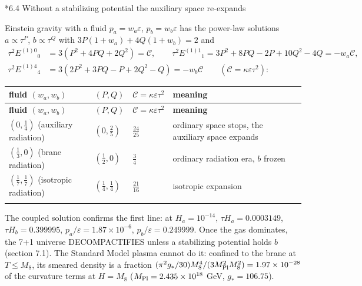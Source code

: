 \documentclass[10pt,a4paper]{article}
\makeatletter
\renewcommand\subsection{\@startsection{subsection}{2}{\z@}{-3.25ex\@plus -1ex \@minus -.2ex}{1.5ex \@plus .2ex}{\normalfont\large\bfseries\raggedright}}
\makeatother
\begin{document}
\subsection*{6.4 Without a stabilizing potential the auxiliary space re-expands}
Einstein gravity with a fluid $p_a=w_a\varepsilon$, $p_b=w_b\varepsilon$ has the power-law solutions $a\propto\tau^P$, $b\propto\tau^Q$ with $3P(1+w_a)+4Q(1+w_b)=2$ and
\begin{align*}
\tau^2E^{(1)0}{}_0&=3(P^2+4PQ+2Q^2)=\mathcal C,\qquad \tau^2E^{(1)1}{}_1=3P^2+8PQ-2P+10Q^2-4Q=-w_a\mathcal C, \\
\tau^2E^{(1)4}{}_4&=3(2P^2+3PQ-P+2Q^2-Q)=-w_b\mathcal C\qquad(\mathcal C=\kappa\varepsilon\tau^2):
\end{align*}
{\footnotesize
\begin{longtable}{>{\raggedright\arraybackslash}p{}>{\raggedright\arraybackslash}p{}>{\raggedright\arraybackslash}p{}>{\raggedright\arraybackslash}p{}}
\toprule
\textbf{fluid $(w_a,w_b)$} & \textbf{$(P,Q)$} & \textbf{$\mathcal C=\kappa\varepsilon\tau^2$} & \textbf{meaning} \\
\midrule\endfirsthead
\toprule
\textbf{fluid $(w_a,w_b)$} & \textbf{$(P,Q)$} & \textbf{$\mathcal C=\kappa\varepsilon\tau^2$} & \textbf{meaning} \\
\midrule\endhead
\endfoot
\bottomrule\endlastfoot
$(0,\tfrac14)$ (auxiliary radiation) & $(0,\tfrac25)$ & $\tfrac{24}{25}$ & ordinary space stops, the auxiliary space expands \\
$(\tfrac13,0)$ (brane radiation) & $(\tfrac12,0)$ & $\tfrac34$ & ordinary radiation era, $b$ frozen \\
$(\tfrac17,\tfrac17)$ (isotropic radiation) & $(\tfrac14,\tfrac14)$ & $\tfrac{21}{16}$ & isotropic expansion \\*
\end{longtable}}
The coupled solution confirms the first line: at $H_a=10^{-14}$, $\tau H_a=0.0003149$, $\tau H_b=0.399995$, $p_a/\varepsilon=1.87\times10^{-6}$, $p_b/\varepsilon=0.249999$. Once the gas dominates, the 7+1 universe DECOMPACTIFIES unless a stabilizing potential holds $b$ (section 7.1). The Standard Model plasma cannot do it: confined to the brane at $T\le M_8$, its smeared density is a fraction $(\pi^2g_*/30)M_8^4/(3M_{\rm Pl}^2M_8^2)=1.97\times10^{-28}$ of the curvature terms at $H=M_8$ ($M_{\rm Pl}=2.435\times10^{18}$ GeV, $g_*=106.75$).
\end{document}
